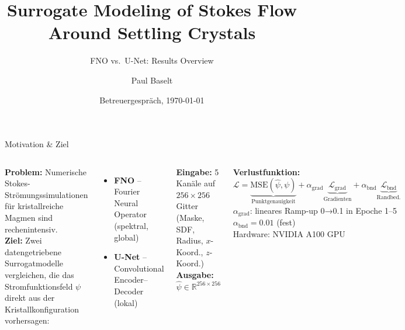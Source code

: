 \documentclass[aspectratio=169, 10pt]{beamer}
\title{Surrogate Modeling of Stokes Flow\\Around Settling Crystals}
\subtitle{FNO vs.\ U-Net: Results Overview}
\author{Paul Baselt}
\date{Betreuergespräch, \today}
\begin{document}
\maketitle

\begin{frame}{Motivation \& Ziel}
\begin{columns}
\textbf{Problem:} Numerische Stokes-Strömungssimulationen für
kristallreiche Magmen sind rechenintensiv.\\[8pt]

\textbf{Ziel:} Zwei datengetriebene Surrogatmodelle vergleichen, die
das Stromfunktionsfeld $\psi$ direkt aus der Kristall\-konfiguration
vorhersagen:
\begin{itemize}
  \item \textbf{FNO} – Fourier Neural Operator (spektral, global)
  \item \textbf{U-Net} – Convolutional Encoder–Decoder (lokal)
\end{itemize}
\vspace{6pt}
\textbf{Eingabe:} 5 Kanäle auf $256\!\times\!256$ Gitter\\
(Maske, SDF, Radius, $x$-Koord., $z$-Koord.)\\[4pt]
\textbf{Ausgabe:} $\hat\psi \in \mathbb{R}^{256\times256}$

\textbf{Verlustfunktion:}
\[
  \mathcal{L} = \underbrace{\mathrm{MSE}(\hat\psi,\psi)}_{\text{Punktgenauigkeit}}
  + \alpha_\text{grad}\underbrace{\mathcal{L}_\text{grad}}_{\text{Gradienten}}
  + \alpha_\text{bnd}\underbrace{\mathcal{L}_\text{bnd}}_{\text{Randbed.}}
\]
$\alpha_\text{grad}$: lineares Ramp-up 0→0.1 in Epoche 1–5\\
$\alpha_\text{bnd} = 0.01$ (fest)\\[6pt]
Hardware: NVIDIA A100 GPU
\end{columns}
\end{frame}
\end{document}
